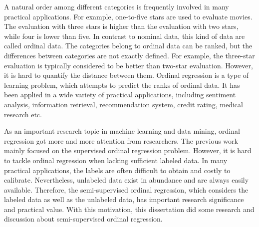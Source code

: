 \begin{enabstract}

A natural order among different categories is frequently involved in many practical applications. For example, one-to-five stars are used to evaluate movies. The evaluation with three stars is higher than the evaluation with two stars, while four is lower than five. In contrast to nominal data, this kind of data are called ordinal data. The categories belong to ordinal data can be ranked, but the differences between categories are not exactly defined. For example, the three-star evaluation is typically considered to be better than two-star evaluation. However, it is hard to quantify the distance between them. Ordinal regression is a type of learning problem, which attempts to predict the ranks of ordinal data. It has been applied in a wide variety of practical applications, including sentiment analysis, information retrieval, recommendation system, credit rating, medical research etc.

As an important research topic in machine learning and data mining, ordinal regression got more and more attention from researchers. The previous work mainly focused on the supervised ordinal regression problem. However, it is hard to tackle ordinal regression when lacking sufficient labeled data. In many practical applications, the labels are often difficult to obtain and costly to calibrate. Nevertheless, unlabeled data exist in abundance and are always easily available. Therefore, the semi-supervised ordinal regression, which considers the labeled data as well as the unlabeled data, has important research significance and practical value. With this motivation, this dissertation did some research and discussion about semi-supervised ordinal regression.


\end{enabstract}
